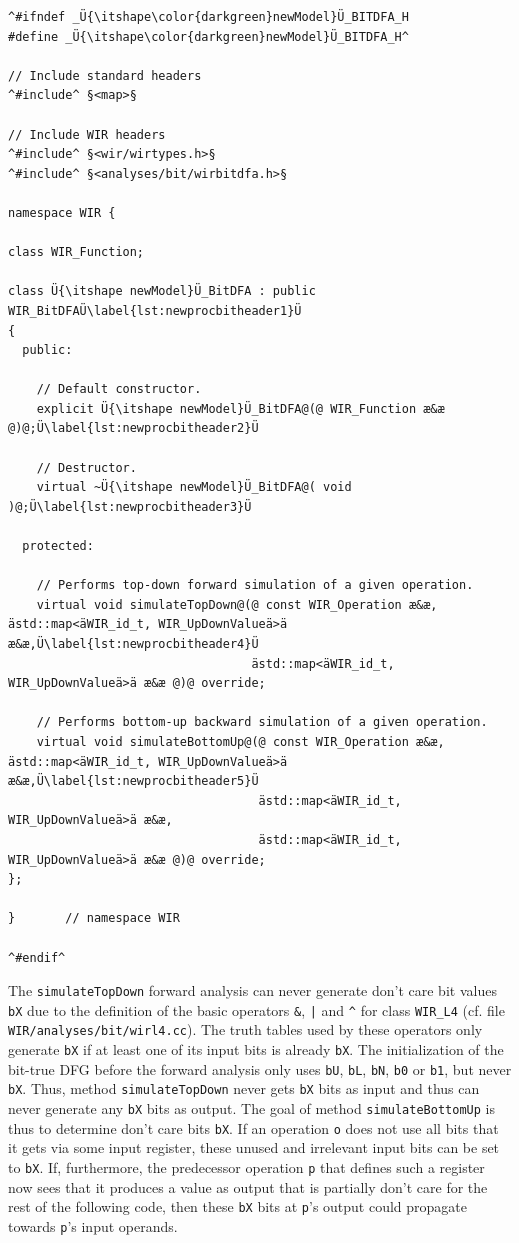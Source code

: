 \begin{lstlisting}[style=code,float=!t,caption={Header File for a New Processor Model's Bit-True Data Flow Analysis},label=lst:newprocbitheader]
^#ifndef _Ü{\itshape\color{darkgreen}newModel}Ü_BITDFA_H
#define _Ü{\itshape\color{darkgreen}newModel}Ü_BITDFA_H^

// Include standard headers
^#include^ §<map>§

// Include WIR headers
^#include^ §<wir/wirtypes.h>§
^#include^ §<analyses/bit/wirbitdfa.h>§

namespace WIR {

class WIR_Function;

class Ü{\itshape newModel}Ü_BitDFA : public WIR_BitDFAÜ\label{lst:newprocbitheader1}Ü
{
  public:

    // Default constructor.
    explicit Ü{\itshape newModel}Ü_BitDFA@(@ WIR_Function æ&æ @)@;Ü\label{lst:newprocbitheader2}Ü

    // Destructor.
    virtual ~Ü{\itshape newModel}Ü_BitDFA@( void )@;Ü\label{lst:newprocbitheader3}Ü

  protected:

    // Performs top-down forward simulation of a given operation.
    virtual void simulateTopDown@(@ const WIR_Operation æ&æ, ästd::map<äWIR_id_t, WIR_UpDownValueä>ä æ&æ,Ü\label{lst:newprocbitheader4}Ü
                                  ästd::map<äWIR_id_t, WIR_UpDownValueä>ä æ&æ @)@ override;

    // Performs bottom-up backward simulation of a given operation.
    virtual void simulateBottomUp@(@ const WIR_Operation æ&æ, ästd::map<äWIR_id_t, WIR_UpDownValueä>ä æ&æ,Ü\label{lst:newprocbitheader5}Ü
                                   ästd::map<äWIR_id_t, WIR_UpDownValueä>ä æ&æ,
                                   ästd::map<äWIR_id_t, WIR_UpDownValueä>ä æ&æ @)@ override;
};

}       // namespace WIR

^#endif^
\end{lstlisting}

The \texttt{simulateTopDown} forward analysis can never generate don't care bit values \texttt{bX} due to the definition of the basic operators \texttt{\&}, \texttt{|} and \texttt{\^} for class \texttt{WIR\_L4} (cf. file \texttt{WIR/analyses/bit/wirl4.cc}).
The truth tables used by these operators only generate \texttt{bX} if at least one of its input bits is already \texttt{bX}.
The initialization of the bit-true \gls{DFG} before the forward analysis only uses \texttt{bU}, \texttt{bL}, \texttt{bN}, \texttt{b0} or \texttt{b1}, but never \texttt{bX}.
Thus, method \texttt{simulateTopDown} never gets \texttt{bX} bits as input and thus can never generate any \texttt{bX} bits as output.
The goal of method \texttt{simulateBottomUp} is thus to determine don't care bits \texttt{bX}.
If an operation \texttt{o} does not use all bits that it gets via some input register, these unused and irrelevant input bits can be set to \texttt{bX}.
If, furthermore, the predecessor operation \texttt{p} that defines such a register now sees that it produces a value as output that is partially don't care for the rest of the following code, then these \texttt{bX} bits at \texttt{p}'s output could propagate towards \texttt{p}'s input operands.

